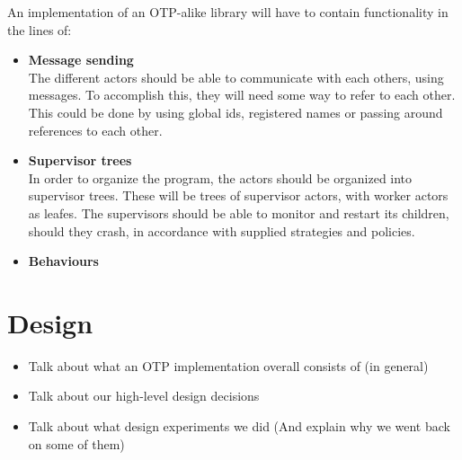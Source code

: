 \documentclass[a4paper]{article}
\begin{document}
An implementation of an OTP-alike library will have to contain functionality in the lines of:
\begin{itemize}
\item \textbf{Message sending}\\
  The different actors should be able to communicate with each others, using
  messages. To accomplish this, they will need some way to refer to each other.
  This could be done by using global ids, registered names or passing around
  references to each other.
\item \textbf{Supervisor trees}\\
  In order to organize the program, the actors should be organized into
  supervisor trees. These will be trees of supervisor actors, with worker actors
  as leafes. The supervisors should be able to monitor and restart its children,
  should they crash, in accordance with supplied strategies and policies.
\item \textbf{Behaviours}
\end{itemize}


\section{Design}
\begin{itemize}
\item Talk about what an OTP implementation overall consists of (in general)
\item Talk about our high-level design decisions
\item Talk about what design experiments we did (And explain why we went back on
  some of them)
\end{itemize}
\end{document}
